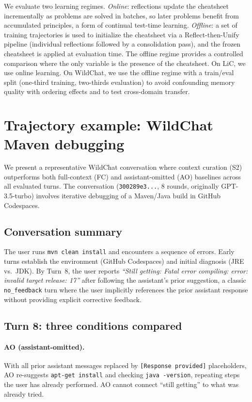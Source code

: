 \documentclass{article}
\begin{document}
We evaluate two learning regimes. \emph{Online}: reflections update the cheatsheet incrementally as problems are solved in batches, so later problems benefit from accumulated principles, a form of continual test-time learning. \emph{Offline}: a set of training trajectories is used to initialize the cheatsheet via a Reflect-then-Unify pipeline (individual reflections followed by a consolidation pass), and the frozen cheatsheet is applied at evaluation time. The offline regime provides a controlled comparison where the only variable is the presence of the cheatsheet. On LiC, we use online learning. On WildChat, we use the offline regime with a train/eval split (one-third training, two-thirds evaluation) to avoid confounding memory quality with ordering effects and to test cross-domain transfer.


\section{Trajectory example: WildChat Maven debugging}
\label{app:trajectories}

We present a representative WildChat conversation where context curation (S2) outperforms both full-context (FC) and assistant-omitted (AO) baselines across all evaluated turns. The conversation (\texttt{300289e3...}, 8 rounds, originally GPT-3.5-turbo) involves iterative debugging of a Maven/Java build in GitHub Codespaces.

\subsection{Conversation summary}

The user runs \texttt{mvn clean install} and encounters a sequence of errors. Early turns establish the environment (GitHub Codespaces) and initial diagnosis (JRE vs.\ JDK). By Turn~8, the user reports \emph{``Still getting: Fatal error compiling: error: invalid target release: 17''} after following the assistant's prior suggestion, a classic \texttt{no\_feedback} turn where the user implicitly references the prior assistant response without providing explicit corrective feedback.

\subsection{Turn 8: three conditions compared}

\paragraph{AO (assistant-omitted).} With all prior assistant messages replaced by \texttt{[Response provided]} placeholders, AO re-suggests \texttt{apt-get install} and checking \texttt{java -version}, repeating steps the user has already performed. AO cannot connect ``still getting'' to what was already tried.
\end{document}
